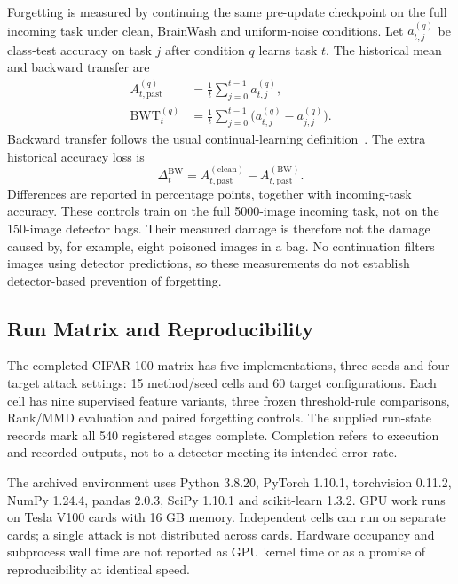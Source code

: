 Forgetting is measured by continuing the same pre-update checkpoint on
the full incoming task under clean, BrainWash and uniform-noise conditions.
Let $a_{t,j}^{(q)}$ be class-test accuracy on task $j$ after condition $q$
learns task $t$. The historical mean and backward transfer are
\begin{align}
    A_{t,\mathrm{past}}^{(q)}
       &=\frac{1}{t}\sum_{j=0}^{t-1}a_{t,j}^{(q)},\\
    \operatorname{BWT}_{t}^{(q)}
       &=\frac{1}{t}\sum_{j=0}^{t-1}
                   \bigl(a_{t,j}^{(q)}-a_{j,j}^{(q)}\bigr).
    \label{eq:setup-retention}
\end{align}
Backward transfer follows the usual continual-learning
definition~\cite{lopezpaz2017gem}. The extra historical accuracy loss is
\begin{equation}
    \Delta_t^{\mathrm{BW}}
       =A_{t,\mathrm{past}}^{(\mathrm{clean})}
        -A_{t,\mathrm{past}}^{(\mathrm{BW})}.
    \label{eq:setup-attack-damage}
\end{equation}
Differences are reported in percentage points, together with incoming-task
accuracy. These controls train on the full 5000-image incoming task, not
on the 150-image detector bags. Their measured damage is therefore not
the damage caused by, for example, eight poisoned images in a bag.
No continuation filters images using detector predictions, so these
measurements do not establish detector-based prevention of forgetting.

\subsection{Run Matrix and Reproducibility}
\label{subsec:setup-reproducibility}

The completed CIFAR-100 matrix has five implementations, three seeds and
four target attack settings: 15 method/seed cells and 60 target
configurations. Each cell has nine supervised feature variants, three
frozen threshold-rule comparisons, Rank/MMD evaluation and paired
forgetting controls. The supplied run-state records mark all 540
registered stages complete. Completion refers to execution and recorded
outputs, not to a detector meeting its intended error rate.

The archived environment uses Python 3.8.20, PyTorch 1.10.1, torchvision
0.11.2, NumPy 1.24.4, pandas 2.0.3, SciPy 1.10.1 and scikit-learn 1.3.2.
GPU work runs on Tesla V100 cards with 16 GB memory. Independent cells
can run on separate cards; a single attack is not distributed across
cards. Hardware occupancy and subprocess wall time are not reported as
GPU kernel time or as a promise of reproducibility at identical speed.


